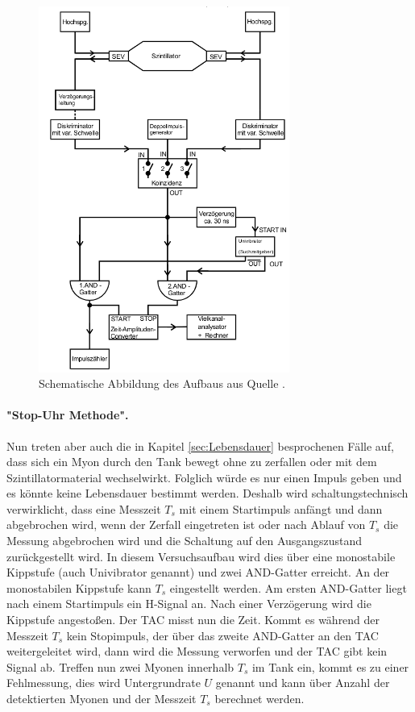 \begin{figure}
  \centering
  \includegraphics[height=12cm]{pics/Aufbau.png}
  \caption{Schematische Abbildung des Aufbaus aus Quelle \cite{Anleitung}.}
  \label{fig:aufbau}
\end{figure}

\paragraph{"Stop-Uhr Methode".}
Nun treten aber auch die in Kapitel 
\ref{sec:Lebensdauer} besprochenen Fälle auf, dass sich ein Myon durch den Tank bewegt ohne zu zerfallen oder mit 
dem Szintillatormaterial wechselwirkt. Folglich würde es nur einen Impuls geben und es könnte keine Lebensdauer 
bestimmt werden. Deshalb wird schaltungstechnisch verwirklicht, dass eine Messzeit $T_s$ mit einem Startimpuls 
anfängt und dann abgebrochen wird, wenn der Zerfall eingetreten ist oder nach Ablauf von $T_s$ die Messung 
abgebrochen wird und die Schaltung auf den Ausgangszustand zurückgestellt wird. In diesem Versuchsaufbau wird 
dies über eine monostabile Kippstufe (auch Univibrator genannt) und zwei AND-Gatter erreicht. An der monostabilen 
Kippstufe kann $T_s$ eingestellt werden. Am ersten AND-Gatter liegt nach einem Startimpuls ein H-Signal an. 
Nach einer Verzögerung wird die Kippstufe angestoßen. Der TAC misst nun die Zeit. Kommt es während der Messzeit 
$T_s$ kein Stopimpuls, der über das zweite AND-Gatter an den TAC weitergeleitet wird, dann wird die Messung 
verworfen und der TAC gibt kein Signal ab. Treffen nun zwei Myonen innerhalb $T_s$ im Tank ein, kommt es 
zu einer Fehlmessung, dies wird Untergrundrate $U$ genannt und kann über Anzahl der detektierten Myonen und der 
Messzeit $T_s$ berechnet werden. 

